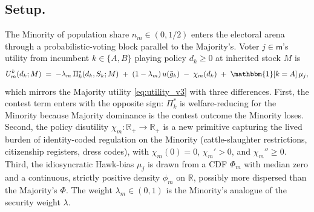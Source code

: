 \documentclass[11pt,twoside]{extarticle}
\begin{document}
\subsection*{Setup.}

The Minority of population share $n_m\in(0,1/2)$ enters the electoral arena through a probabilistic-voting block parallel to the Majority's. Voter $j\in\mathsf{m}$'s utility from incumbent $k\in\{A,B\}$ playing policy $d_k\ge 0$ at inherited stock $M$ is
\begin{equation}\label{eq:utility_minority_oaF}
    U^k_m(d_k;M)\;=\;-\lambda_m\,\Pi_k^*(d_k,S_k;M)\;+\;(1-\lambda_m)\,u(\bar g_k)\;-\;\chi_m(d_k)\;+\;\mathbbm{1}[k=A]\,\mu_j,
\end{equation}
which mirrors the Majority utility \autoref{eq:utility_v3} with three differences. First, the contest term enters with the opposite sign: $\Pi_k^*$ is welfare-reducing for the Minority because Majority dominance is the contest outcome the Minority loses. Second, the policy disutility $\chi_m:\mathbb{R}_+\to\mathbb{R}_+$ is a new primitive capturing the lived burden of identity-coded regulation on the Minority (cattle-slaughter restrictions, citizenship registers, dress codes), with $\chi_m(0)=0$, $\chi_m'>0$, and $\chi_m''\ge 0$. Third, the idiosyncratic Hawk-bias $\mu_j$ is drawn from a CDF $\Phi_m$ with median zero and a continuous, strictly positive density $\phi_m$ on $\mathbb{R}$, possibly more dispersed than the Majority's $\Phi$. The weight $\lambda_m\in(0,1)$ is the Minority's analogue of the security weight $\lambda$.
\end{document}
